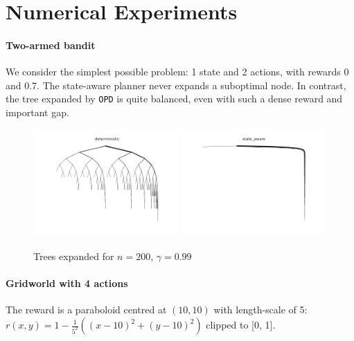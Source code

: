 \documentclass{article}
\begin{document}
\section{Numerical Experiments}

\paragraph{Two-armed bandit}

We consider the simplest possible problem: 1 state and 2 actions, with rewards 0 and 0.7. The state-aware planner never expands a suboptimal node. In contrast, the tree expanded by \texttt{OPD} is quite balanced, even with such a dense reward and important gap.
\begin{figure}[H]
    \centering
    \includegraphics[width=0.49\textwidth]{img/bandit_deterministic.pdf}
    \includegraphics[width=0.49\textwidth]{img/bandit_state_aware.pdf}
    \caption{Trees expanded for $n = 200$, $\gamma=0.99$}
    \label{fig:bandit_trees}
\end{figure}

\paragraph{Gridworld with 4 actions}

The reward is a paraboloid centred at $(10, 10)$ with length-scale of 5:  $r(x, y) = 1 - \frac{1}{5^2}((x-10)^2 + (y-10)^2)$ clipped to [0, 1].
\end{document}
